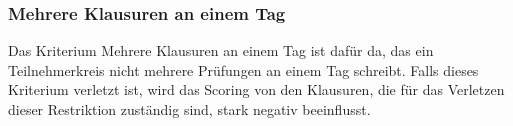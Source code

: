 \subsubsection{Mehrere Klausuren an einem Tag}
Das Kriterium Mehrere Klausuren an einem Tag ist dafür da, das ein Teilnehmerkreis nicht mehrere Prüfungen
an einem Tag schreibt.
Falls dieses Kriterium verletzt ist, wird das Scoring von den Klausuren, die für das Verletzen dieser Restriktion zuständig sind,
stark negativ beeinflusst.
